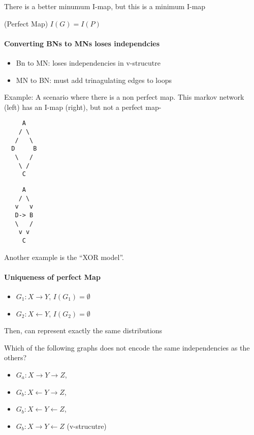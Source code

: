 There is a better minumum I-map, but this is a minimum I-map

\begin{definition}(Perfect Map)
$I(G) = I(P)$ 
\end{definition}

\paragraph{Converting BNs to MNs loses independcies}

\begin{itemize}
 \item Bn to MN: loses independencies in v-strucutre
 \item MN to BN: must add trinagulating edges to loops
\end{itemize}


Example: A scenario where there is a non perfect map.
This markov network (left) has an I-map (right), but not a perfect map-
\begin{paracol}{2}
\begin{verbatim}
     A
    / \
   /   \
  D     B
   \   /
    \ /
     C     
\end{verbatim}
\switchcolumn
\begin{verbatim}
     A
    / \
   v   v
   D-> B
   \   /
    v v
     C     
\end{verbatim}
\end{paracol}

Another example is the ``XOR model''.


\paragraph{Uniqueness of perfect Map}

\begin{itemize}
 \item $G_1: X \rightarrow Y $, $I(G_1) = \emptyset$
  \item $G_2: X \leftarrow Y $, $I(G_2) = \emptyset$
\end{itemize}
  Then, can represent exactly the same distributions

  \vspace{0.3cm}
  
  Which of the following graphs does not encode the same independencies as the others?
  
\begin{itemize}
 \item $G_a: X \rightarrow Y \rightarrow Z$,
  \item $G_b: X \leftarrow Y \rightarrow Z $,
\item $G_b: X \leftarrow Y \leftarrow  Z$,
\item $G_b: X \rightarrow Y \leftarrow Z $ (v-strucutre)
\end{itemize}

